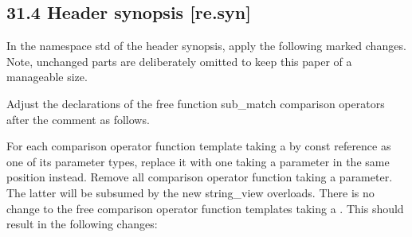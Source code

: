 \documentclass[ebook,11pt,article]{memoir}
\begin{document}
\subsection{31.4 Header  synopsis [re.syn]}
In the namespace std of the header synopsis, apply the following marked changes. Note, unchanged parts are deliberately omitted to keep this paper of a manageable size.

Adjust the declarations of the free function sub_match comparison operators after the comment  as follows.

For each comparison operator function template taking a  by const reference as one of its parameter types, replace it with one taking a  parameter in the same position instead. Remove all comparison operator function taking a  parameter. The latter will be subsumed by the new string_view overloads. There is no change to the free comparison operator function templates taking a . This should result in the following changes:
\end{document}

